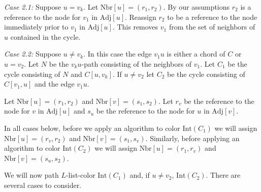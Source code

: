 \documentclass[letterpaper, 12pt]{article}
\theoremstyle{definition}
\theoremstyle{definition}
\theoremstyle{thm}
\theoremstyle{definition}
\begin{document}
\textit{Case 2.1:} Suppose $u=v_k$. Let $\text{Nbr}[u]=(r_1,r_2)$. By our
assumptions $r_2$ is a reference to the node for $v_1$ in $\text{Adj}[u]$.
Reassign $r_2$ to be a reference to the node immediately prior to $v_1$ in
$\text{Adj}[u]$. This removes $v_1$ from the set of neighbors of $u$ contained
in the cycle.

\textit{Case 2.2:} Suppose $u\ne v_k$. In this case the edge $v_1u$ is either a
chord of $C$ or $u=v_2$. Let $N$ be the $v_ku$-path consisting of the neighbors
of $v_1$. Let $C_1$ be the cycle consisting of $N$ and $C[u,v_k]$. If $u\ne v_2$
let $C_2$ be the cycle consisting of $C[v_1,u]$ and the edge $v_1u$.

Let $\text{Nbr}[u]=(r_1,r_2)$ and
$\text{Nbr}[v]=(s_1,s_2)$. Let $r_v$ be the reference to the node for
$v$ in $\text{Adj}[u]$ and $s_u$ be the reference to the node for $u$ in
$\text{Adj}[v]$.

In all cases below, before we apply an algorithm to color
$\text{Int}(C_1)$ we will assign $\text{Nbr}[u]=(r_v,r_2)$ and $\text{Nbr}[v]=
(s_1,s_v)$. Similarly, before applying an algorithm to color $\text{Int}(C_2)$
we will assign $\text{Nbr}[u]=(r_1,r_v)$ and $\text{Nbr}[v]=(s_u,s_2)$.

We will now path $L$-list-color $\text{Int}(C_1)$ and, if $u\ne v_2$,
$\text{Int}(C_2)$. There are several cases to consider.
\end{document}
